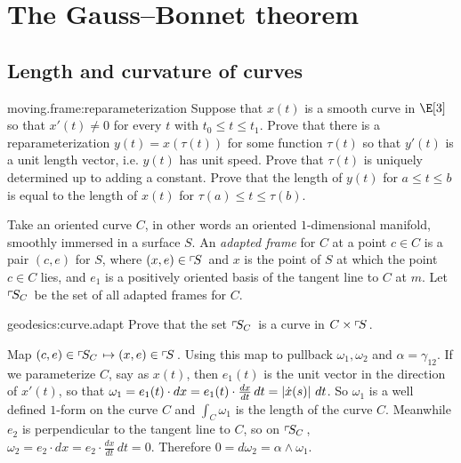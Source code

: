 \chapter{The Gauss--Bonnet theorem}\label{chapter:Gauss.Bonnet}%


\section{Length and curvature of curves}
\begin{problem}{moving.frame:reparameterization}
Suppose that \(x(t)\) is a smooth curve in \(\E[3]\) so that \(x'(t) \ne 0\) for every \(t\) with \(t_0 \le t \le t_1\).
Prove that there is a reparameterization \(y(t)=x(\tau(t))\) for some function \(\tau(t)\) so that \(y'(t)\) is a unit length vector, i.e. \(y(t)\) has unit speed.
Prove that \(\tau(t)\) is uniquely determined up to adding a constant.
Prove that the length of \(y(t)\) for \(a \le t \le b\) is equal to the length of \(x(t)\) for \(\tau(a) \le t \le \tau(b)\).
\end{problem}
Take an oriented curve \(C\), in other words an oriented \(1\)-dimensional manifold, smoothly immersed in a surface \(S\).
An \emph{adapted frame}%
for \(C\) at a point \(c \in C\) is a pair \((c,e)\) for \(S\), where \((x,e)\in\frameBundle{S}\) and \(x\) is the point of \(S\) at which the point \(c\in C\) lies, and \(e_1\) is a positively oriented basis of the tangent line to \(C\) at \(m\).
Let \(\adaptedFrameBundle{C}{S}\) be the set of all adapted frames for \(C\).
\begin{problem}{geodesics:curve.adapt}
Prove that the set \(\adaptedFrameBundle{C}{S}\) is a curve in \(C \times \frameBundle{S}\).
\end{problem}
Map \(\pr{c,e} \in \adaptedFrameBundle{C}{S} \mapsto \pr{x,e} \in \frameBundle{S}\).
Using this map to pullback \(\omega_1, \omega_2\) and \(\alpha=\gamma_{12}\).
If we parameterize \(C\), say as \(x(t)\), then \(e_1(t)\) is the unit vector in the direction of \(x'(t)\), so that \(\omega_1=e_1(t) \cdot dx=e_1(t) \cdot \frac{dx}{dt} \, dt=\norm{\dot{x}(s)} \, dt\).
So \(\omega_1\) is a well defined \(1\)-form on the curve \(C\) and \(\int_C \omega_1\) is the length of the curve \(C\).
Meanwhile \(e_2\) is perpendicular to the tangent line to \(C\), so on \(\adaptedFrameBundle{C}{S}\), \(\omega_2=e_2 \cdot dx=e_2 \cdot \frac{dx}{dt} \, dt=0\).
Therefore \(0=d\omega_2=\alpha \wedge \omega_1\).


